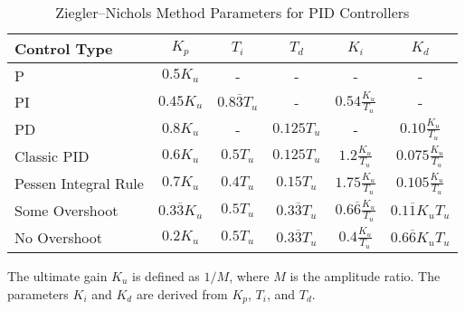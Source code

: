 \begin{table}[ht]
    \centering
    \caption{Ziegler--Nichols Method Parameters for PID Controllers}
    \label{tab:ziegler-nichols}
    \begin{tabular}{|l|c|c|c|c|c|}
        \hline
        Control Type         & \( K_p \)                  & \( T_i \)                  & \( T_d \)                   & \( K_i \)                              & \( K_d \)                      \\
        \hline
        P                    & \( 0.5 K_u \)              & -                          & -                           & -                                      & -                              \\
        PI                   & \( 0.45 K_u \)             & \( 0.8 \overline{3} T_u \) & -                           & \( 0.54 \frac{K_u}{T_u} \)             & -                              \\
        PD                   & \( 0.8 K_u \)              & -                          & \( 0.125 T_u \)             & -                                      & \( 0.10 \frac{K_u}{T_u} \)     \\
        Classic PID          & \( 0.6 K_u \)              & \( 0.5 T_u \)              & \( 0.125 T_u \)             & \( 1.2 \frac{K_u}{T_u} \)              & \( 0.075 \frac{K_u}{T_u} \)    \\
        Pessen Integral Rule & \( 0.7 K_u \)              & \( 0.4 T_u \)              & \( 0.15 T_u \)              & \( 1.75 \frac{K_u}{T_u} \)             & \( 0.105 \frac{K_u}{T_u} \)    \\
        Some Overshoot       & \( 0.3 \overline{3} K_u \) & \( 0.5 T_u \)              & \( 0.3 \overline{3}{T_u} \) & \( 0.6 \overline{6} \frac{K_u}{T_u} \) & \( 0.1 \overline{1} K_u T_u \) \\
        No Overshoot         & \( 0.2 K_u \)              & \( 0.5 T_u \)              & \( 0.3 \overline{3}{T_u} \) & \( 0.4 \frac{K_u}{T_u} \)              & \( 0.6 \overline{6} K_u T_u \) \\
        \hline
    \end{tabular}
\end{table}

The ultimate gain \( K_u \) is defined as \( 1/M \), where \( M \) is the
amplitude ratio. The parameters \( K_i \) and \( K_d \) are derived from \( K_p
\), \( T_i \), and \( T_d \).